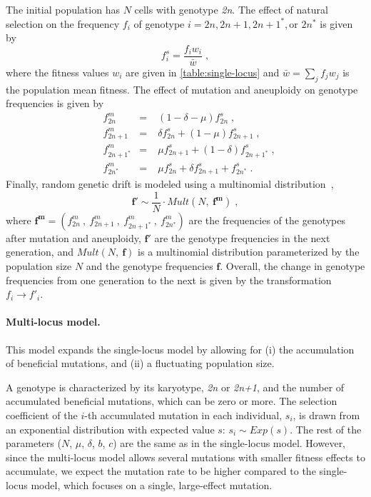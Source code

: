 \documentclass[12pt]{extarticle}
\let\vec\mathbf
\newcommand{\euwt}{\emph{2n}}
\newcommand{\anwt}{\emph{2n+1}}
\begin{document}
The initial population has $N$ cells with genotype \euwt.
The effect of natural selection on the frequency $f_i$ of genotype $i = 2n, 2n+1, 2n+1^*, \text{or } 2n^*$ is given by
    \begin{equation} \label{eq:selection-single} 
      f^s_i = \frac{f_i w_i}{\bar{w}} \;,
    \end{equation}
where the fitness values $w_i$ are given in \cref{table:single-locus} and $\bar{w} = \sum_{j}{f_j w_j}$ is the population mean fitness.
The effect of mutation and aneuploidy on genotype frequencies is given by
    \begin{equation} \label{eq:mutation-aneuploidy-single}
    \begin{aligned}
      &f^m_{2n} &=&\; (1 - \delta - \mu) f^s_{2n}  \;,\\
      &f^m_{2n+1} &=&\; \delta f^s_{2n} + (1 - \mu) f^s_{2n+1}  \;,\\
      &f^m_{2n+1^*} &=&\; \mu f^s_{2n+1} + (1-\delta) f^s_{2n+1^*}  \;,\\
      &f^m_{2n^*} &=&\; \mu f^s_{2n} + \delta f^s_{2n+1} + f^s_{2n^*}  \;.
    \end{aligned}
    \end{equation}
Finally, random genetic drift is modeled using a multinomial distribution~\citep{Otto2007},
    \begin{equation} \label{eq:drift-single}
      \vec{f'} \sim \frac{1}{N} \cdot \mathit{Mult}(N,\ \vec{f^m}) \;,
    \end{equation}
where $\vec{f^m}=(f^m_{2n}\ ,\ f^m_{2n+1}\ ,\ f^m_{2n+1^*}\ ,\ f^m_{2n^*})$ are the frequencies of the genotypes after mutation and aneuploidy, $\vec{f'}$ are the genotype frequencies in the next generation, and $Mult(N,\ \vec{f})$ is a multinomial distribution parameterized by the population size $N$ and the genotype frequencies $\vec{f}$.
Overall, the change in genotype frequencies from one generation to the next is given by the transformation $f_i \to f'_i$.

\paragraph*{Multi-locus model.}
This model expands the single-locus model by allowing for (i) the accumulation of beneficial mutations, and (ii) a fluctuating population size. 

A genotype is characterized by its karyotype, \euwt\; or \anwt, and the number of accumulated beneficial mutations, which can be zero or more.
The selection coefficient of the $i$-th accumulated mutation in each individual, $s_i$, is drawn from an exponential distribution with expected value $s$: $s_i \sim \mathit{Exp{(s)}}$.
The rest of the parameters ($N$, $\mu$, $\delta$, $b$, $c$) are the same as in the single-locus model. However, since the multi-locus model allows several mutations with smaller fitness effects to accumulate, we expect the mutation rate to be higher compared to the single-locus model, which focuses on a single, large-effect mutation.
\end{document}
